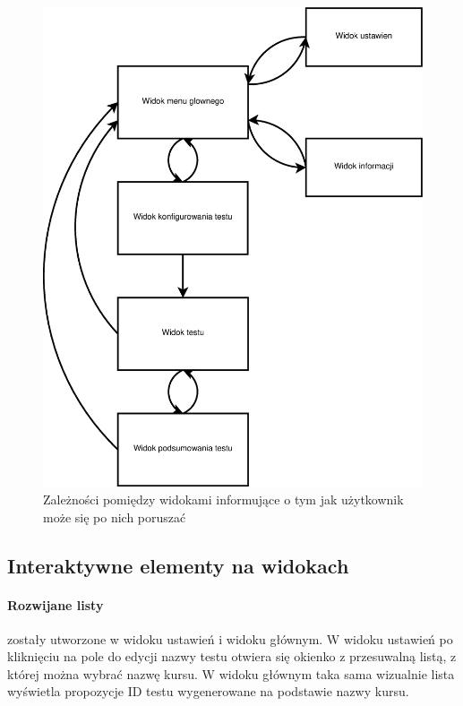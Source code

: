 \documentclass{report}
\begin{document}
			\begin{center}
				\begin{figure}[ht]
					\centering
					\includegraphics[scale=0.40]{diagram_zaleznosci_miedzy_widokami.eps}
					\caption{Zależności pomiędzy widokami informujące o tym jak użytkownik może się po nich poruszać}
				\end{figure}
			\end{center}
		
			\subsection{Interaktywne elementy na widokach}
		
				\paragraph{Rozwijane listy}
				zostały utworzone w widoku ustawień i widoku głównym. W widoku ustawień po kliknięciu na pole do edycji nazwy testu otwiera się okienko z przesuwalną listą, z której można wybrać nazwę kursu. W widoku głównym taka sama wizualnie lista wyświetla propozycje ID testu wygenerowane na podstawie nazwy kursu.
		
\end{document}
